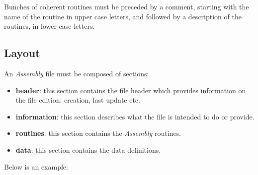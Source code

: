 Bunches of coherent routines must be preceded by a comment, starting with
the name of the routine in upper case letters, and followed by a description
of the routines, in lower-case letters.

%
%

\subsection{Layout}

An \textit{Assembly} file must be composed of sections:

\begin{itemize}
  \item
    \textbf{header}: this section contains the file header which provides
    information on the file edition: creation, last update etc.
  \item
    \textbf{information}: this section describes what the file is intended
    to do or provide.
  \item
    \textbf{routines}: this section contains the \textit{Assembly} routines.
  \item
    \textbf{data}: this section contains the data definitions.
\end{itemize}

Below is an example:

